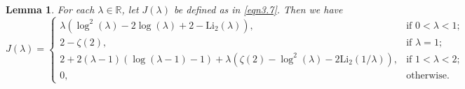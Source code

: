 \documentclass[12pt,reqno]{amsart}
\newtheorem{lemma}[theorem]{Lemma}
\theoremstyle{definition}
\theoremstyle{remark}
\numberwithin{equation}{section}
\def \R {\mathbb{R}}
\def \Li {\mathrm{Li}}
\newcommand\1{\mathds{1}}
\begin{document}
\begin{lemma}\label{lem5.5}
    For each $\lambda\in\R$, let $J(\lambda)$ be defined as in \eqref{eqn3.7}. Then we have
    \begin{equation*}
        J(\lambda)=
        \begin{cases}
        \lambda(\log^2(\lambda) - 2\log(\lambda) + 2-\Li_2(\lambda)), \quad &\text{if }0<\lambda<1;\\
        2-\zeta(2), &\text{if }\lambda = 1;\\
        2 + 2(\lambda-1)(\log(\lambda-1) - 1)+\lambda(\zeta(2)-\log^2(\lambda) - 2\Li_2(1/\lambda)), &\text{if }1<\lambda<2; \\
            0, &\text{otherwise}.
        \end{cases}
    \end{equation*}
\end{lemma}
\end{document}
